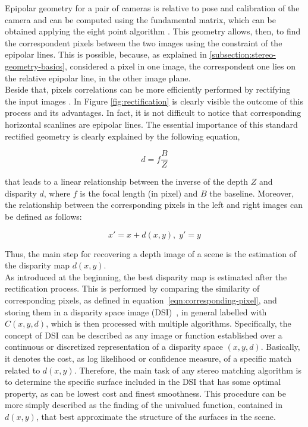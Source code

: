 Epipolar geometry for a pair of cameras is relative to pose and calibration of the camera and can be computed using the fundamental matrix, which can be obtained applying the eight point algorithm \cite{hartley2004multiple}.
This geometry allows, then, to find the correspondent pixels between the two images using the constraint of the epipolar lines.
This is possible, because, as explained in \ref{subsection:stereo-geometry-basics}, considered a pixel in one image, the correspondent one lies on the relative epipolar line, in the other image plane.\\
Beside that, pixels correlations can be more efficiently performed by rectifying the input images \cite{hartley2004multiple}.
In Figure \ref{fig:rectification} is clearly visible the outcome of this process and its advantages.
In fact, it is not difficult to notice that corresponding horizontal scanlines are epipolar lines. 
The essential importance of this standard rectified geometry is clearly explained by the following equation,

\begin{equation} 
\label{eqn:disparity-depth}
	d = f \frac{B}{Z}
\end{equation}

that leads to a linear relationship between the inverse of the depth $Z$ and disparity $d$, where $f$ is the focal length (in pixel) and $B$ the baseline.
Moreover, the relationship between the corresponding pixels in the left and right images can be defined as follows:

\begin{equation} 
\label{eqn:corresponding-pixel}
	x' = x + d(x, y), \; y' = y
\end{equation}

Thus, the main step for recovering a depth image of a scene is the estimation of the disparity map $d(x,y)$.\\
As introduced at the beginning, the best disparity map is estimated after the rectification process. 
This is performed by comparing the similarity of corresponding pixels, as defined in equation~\ref{eqn:corresponding-pixel}, and storing them in a disparity space image (DSI)~\cite{yang1993local}, in general labelled with $C(x,y,d)$, which is then processed with multiple algorithms. 
Specifically, the concept of DSI can be described as any image or function established over a continuous or discretized representation of a disparity space $(x, y, d)$.
Basically, it denotes the cost, as log likelihood or confidence measure, of a specific match related to $d(x, y)$.
Therefore, the main task of any stereo matching algorithm is to determine the specific surface included in the DSI that has some optimal property, as can be lowest cost and finest smoothness.
This procedure can be more simply described as the finding of the univalued function, contained in $d(x, y)$, that best approximate the structure of the surfaces in the scene.

